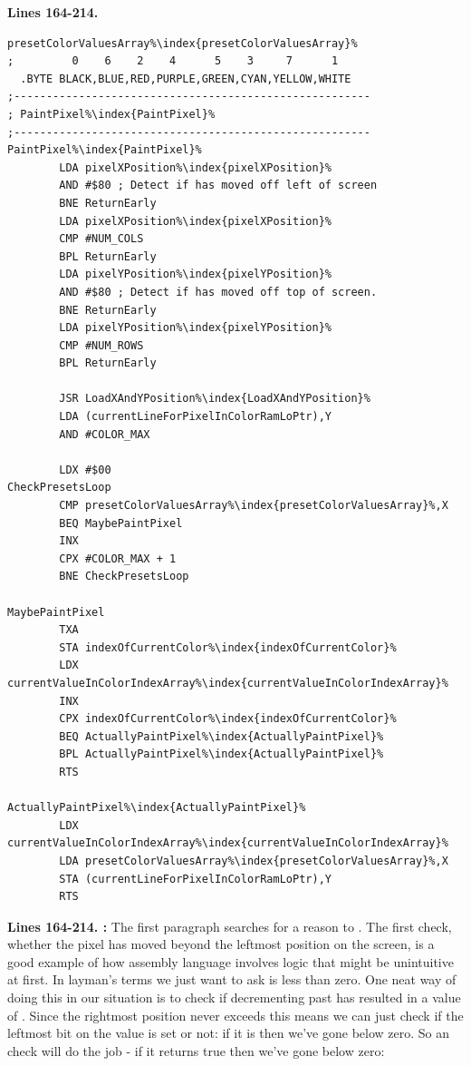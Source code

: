 \clearpage
\textbf{Lines 164-214. }
\begin{lstlisting}[caption=Where the painting is actually done.,escapechar=\%]
presetColorValuesArray%\index{presetColorValuesArray}%
;         0    6    2    4      5    3     7      1
  .BYTE BLACK,BLUE,RED,PURPLE,GREEN,CYAN,YELLOW,WHITE
;-------------------------------------------------------
; PaintPixel%\index{PaintPixel}%
;-------------------------------------------------------
PaintPixel%\index{PaintPixel}%   
        LDA pixelXPosition%\index{pixelXPosition}%
        AND #$80 ; Detect if has moved off left of screen
        BNE ReturnEarly
        LDA pixelXPosition%\index{pixelXPosition}%
        CMP #NUM_COLS
        BPL ReturnEarly
        LDA pixelYPosition%\index{pixelYPosition}%
        AND #$80 ; Detect if has moved off top of screen.
        BNE ReturnEarly
        LDA pixelYPosition%\index{pixelYPosition}%
        CMP #NUM_ROWS
        BPL ReturnEarly

        JSR LoadXAndYPosition%\index{LoadXAndYPosition}%
        LDA (currentLineForPixelInColorRamLoPtr),Y
        AND #COLOR_MAX

        LDX #$00
CheckPresetsLoop   
        CMP presetColorValuesArray%\index{presetColorValuesArray}%,X
        BEQ MaybePaintPixel
        INX 
        CPX #COLOR_MAX + 1
        BNE CheckPresetsLoop

MaybePaintPixel   
        TXA 
        STA indexOfCurrentColor%\index{indexOfCurrentColor}%
        LDX currentValueInColorIndexArray%\index{currentValueInColorIndexArray}%
        INX 
        CPX indexOfCurrentColor%\index{indexOfCurrentColor}%
        BEQ ActuallyPaintPixel%\index{ActuallyPaintPixel}%
        BPL ActuallyPaintPixel%\index{ActuallyPaintPixel}%
        RTS 

ActuallyPaintPixel%\index{ActuallyPaintPixel}%   
        LDX currentValueInColorIndexArray%\index{currentValueInColorIndexArray}%
        LDA presetColorValuesArray%\index{presetColorValuesArray}%,X
        STA (currentLineForPixelInColorRamLoPtr),Y
        RTS 
\end{lstlisting}
\clearpage

\textbf{Lines 164-214. :} The first paragraph searches for a reason to . The first
check, whether the pixel has moved beyond the leftmost position on the screen, is a good example of how assembly language involves
logic that might be unintuitive at first. In layman's terms we just want to ask is  less than zero. One neat
way of doing this in our situation is to check if decrementing past  has resulted in a value of . Since
the rightmost position never exceeds  this means we can just check if the leftmost bit on the value is set or not: if 
it is then we've gone below zero. So an  check will do the job - if it returns true then we've gone below zero:

